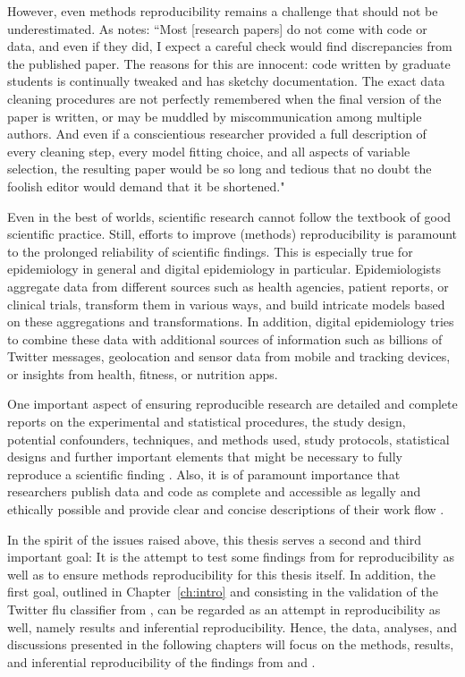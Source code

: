 \documentclass[11pt, a4paper,twoside]{report}\usepackage[]{graphicx}\usepackage[]{color}
\begin{document}
However, even methods reproducibility remains a challenge that should not be underestimated. As \cite{banks_reproducible_2011} notes: ``Most [research papers] do not come with code or data, and even if they did, I expect a careful check would find discrepancies from the published paper. The reasons for this are innocent: code written by graduate students is continually tweaked and has sketchy documentation. The exact data cleaning procedures are not perfectly remembered when the final version of the paper is written, or may be muddled by miscommunication among multiple authors. And even if a conscientious researcher provided a full description of every cleaning step, every model fitting choice, and all aspects of variable selection, the resulting paper would be so long and tedious that no doubt the foolish editor would demand that it be shortened."

Even in the best of worlds, scientific research cannot follow the textbook of good scientific practice. Still, efforts to improve (methods) reproducibility is paramount to the prolonged reliability of scientific findings. This is especially true for epidemiology in general and digital epidemiology in particular. Epidemiologists aggregate data from different sources such as health agencies, patient reports, or clinical trials, transform them in various ways, and build intricate models based on these aggregations and transformations. In addition, digital epidemiology tries to combine these data with additional sources of information such as billions of Twitter messages, geolocation and sensor data from mobile and tracking devices, or insights from health, fitness, or nutrition apps. 

One important aspect of ensuring reproducible research are detailed and complete reports on the experimental and statistical procedures, the study design, potential confounders, techniques, and methods used, study protocols, statistical designs and further important elements that might be necessary to fully reproduce a scientific finding \citep{kass_ten_2016}. Also, it is of paramount importance that researchers publish data and code as complete and accessible as legally and ethically possible and provide clear and concise descriptions of their work flow \citep{peng_reproducible_2006}.

In the spirit of the issues raised above, this thesis serves a second and third important goal: It is the attempt to test some findings from \cite{bodnar_data_2015} for reproducibility as well as to ensure methods reproducibility for this thesis itself. In addition, the first goal, outlined in Chapter~\ref{ch:intro} and consisting in the validation of the Twitter flu classifier from \cite{bodnar_ground_2014}, can be regarded as an attempt in reproducibility as well, namely results and inferential reproducibility. Hence, the data, analyses, and discussions presented in the following chapters will focus on the methods, results, and inferential reproducibility of the findings from \cite{bodnar_ground_2014} and \cite{bodna_data_2015}.
\end{document}
